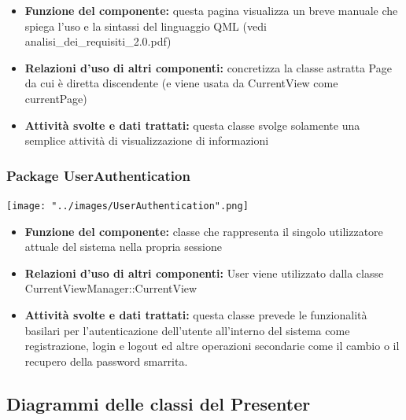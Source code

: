 \documentclass[a4paper,11pt]{article}
\begin{document}
			\begin{itemize}
		    \item\textbf{Funzione del componente:} questa pagina visualizza un breve manuale che spiega l'uso e la sintassi del linguaggio QML (vedi analisi\_dei\_requisiti\_2.0.pdf)
			\item\textbf{Relazioni d'uso di altri componenti:} concretizza la classe astratta Page da cui è diretta discendente (e viene usata da CurrentView come currentPage)
			\item\textbf{Attività svolte e dati trattati:} questa classe svolge solamente una semplice attività di visualizzazione di informazioni
			\end{itemize}
			\subsubsection{Package UserAuthentication}
			\begin{center}
				\texttt{[image: "../images/UserAuthentication".png]}
			\end{center}	
			\begin{itemize}
\item\textbf{Funzione del componente:} classe che rappresenta il singolo utilizzatore attuale del sistema nella propria sessione
\item\textbf{Relazioni d'uso di altri componenti:} User viene utilizzato dalla classe CurrentViewManager::CurrentView
\item\textbf{Attività svolte e dati trattati:} questa classe prevede le funzionalità basilari per l'autenticazione dell'utente all'interno del sistema come registrazione, login e  logout ed altre operazioni secondarie come il cambio o il recupero della password smarrita.
			\end{itemize}
			\newpage
			
			\subsection{Diagrammi delle classi del Presenter}
\end{document}
